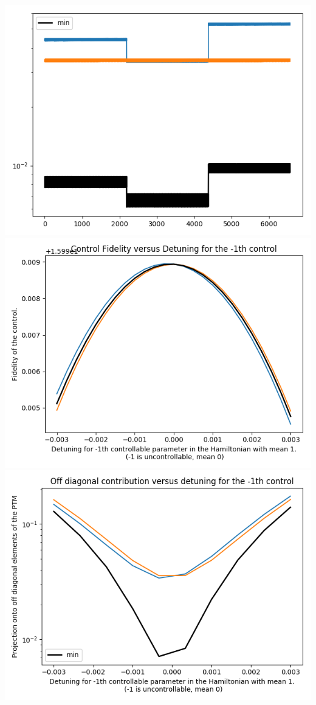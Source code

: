 \documentclass{article}
\begin{document}
\begin{center}
\includegraphics[scale=.9]{report_pickled_controls27/control_dpn_all}
\includegraphics[scale=.9]{control_fid_0}
\includegraphics[scale=.9]{off_diag_0}

\end{center}
\end{document}
